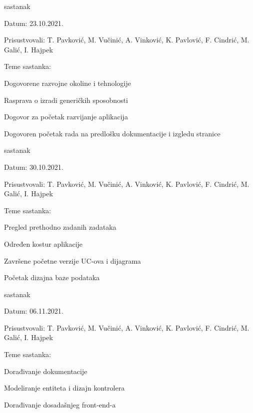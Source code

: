 \begin{packed_enum}
			\item  sastanak
			\item[] \begin{packed_item}
				\item Datum: 23.10.2021.
				\item Prisustvovali: T. Pavković, M. Vučinić, A. Vinković, K. Pavlović, F. Cindrić, M. Galić, I. Hajpek
				\item Teme sastanka:
				\begin{packed_item}
					\item  Dogovorene razvojne okoline i tehnologije
					\item  Rasprava o izradi generičkih sposobnosti
					\item  Dogovor za početak razvijanje aplikacija
					\item  Dogovoren početak rada na predlošku dokumentacije i izgledu stranice
				\end{packed_item}
			\end{packed_item}

			
			\item  sastanak
			\item[] \begin{packed_item}
				\item Datum: 30.10.2021.
				\item Prisustvovali: T. Pavković, M. Vučinić, A. Vinković, K. Pavlović, F. Cindrić, M. Galić, I. Hajpek
				\item Teme sastanka:
				\begin{packed_item}
					\item  Pregled prethodno zadanih zadataka
					\item  Određen kostur aplikacije
					\item  Završene početne verzije UC-ova i dijagrama
					\item  Početak dizajna baze podataka
				\end{packed_item}
			\end{packed_item}

			
			\item  sastanak
			\item[] \begin{packed_item}
				\item Datum: 06.11.2021.
				\item Prisustvovali: T. Pavković, M. Vučinić, A. Vinković, K. Pavlović, F. Cindrić, M. Galić, I. Hajpek
				\item Teme sastanka:
				\begin{packed_item}
					\item  Dorađivanje dokumentacije
					\item  Modeliranje entiteta i dizajn kontrolera
					\item  Dorađivanje dosadašnjeg front-end-a
				\end{packed_item}
			\end{packed_item}


\end{packed_enum}
